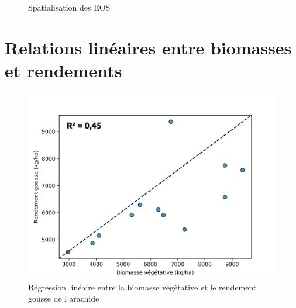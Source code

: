 \begin{figure}[htbp]
 \begin{center}
 \end{center}
 \caption*{Spatialisation des EOS}
\end{figure}

\chapter{Relations linéaires entre biomasses et rendements}\label{annexe-e}

\begin{figure}[htbp]
\caption*{Régression linéaire entre la biomasse végétative et le rendement gousse de l’arachide}
 \begin{center}
  \includegraphics[scale=0.6]{annexes/Biom_vs_Rdt_Arachide.png}
 \end{center}
\end{figure}

